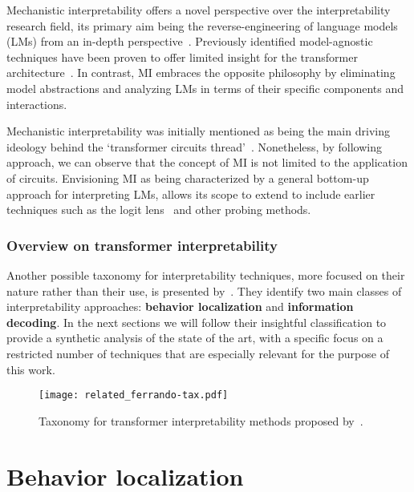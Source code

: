 Mechanistic interpretability offers a novel perspective over the interpretability research field, its primary aim being the reverse-engineering of language models (LMs) from an in-depth perspective~\cite{olah2022}.
Previously identified model-agnostic techniques have been proven to offer limited insight for the transformer architecture~\cite{neely2022,pruthi2022,bibal2022,krishna2024}.
In contrast, MI embraces the opposite philosophy by eliminating model abstractions and analyzing LMs in terms of their specific components and interactions.

Mechanistic interpretability was initially mentioned as being the main driving ideology behind the `transformer circuits thread'~\cite{elhage2021}.
Nonetheless, by following~\citet{rai2024} approach, we can observe that the concept of MI is not limited to the application of circuits.
Envisioning MI as being characterized by a general bottom-up approach for interpreting LMs, allows its scope to extend to include earlier techniques such as the logit lens~\cite{nostalgebraist2020} and other probing methods.

\subsubsection*{Overview on transformer interpretability}

Another possible taxonomy for interpretability techniques, more focused on their nature rather than their use, is presented by~\citet{ferrando2024}.
They identify two main classes of interpretability approaches: \textbf{behavior localization} and \textbf{information decoding}.
In the next sections we will follow their insightful classification to provide a synthetic analysis of the state of the art, with a specific focus on a restricted number of techniques that are especially relevant for the purpose of this work.

\begin{figure}[t!]
    \centering
    \texttt{[image: related\_ferrando-tax.pdf]}
    \caption{Taxonomy for transformer interpretability methods proposed by~\citet{ferrando2024}.}
    \label{fig:related_ferrando-tax}
\end{figure}

\section{Behavior localization}

